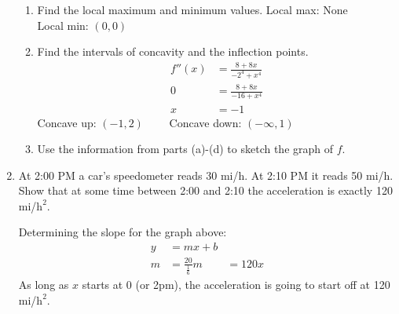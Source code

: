 \documentclass{article}
\begin{document}
\begin{enumerate}
\begin{enumerate}
			\item Find the local maximum and minimum values.\newline
				Local max: None $\qquad$ Local min: $(0,0)$
			\item Find the intervals of concavity and the inflection points.\\
				$$\begin{align}
					f''(x)&=\frac{8+8x}{-2^4+x^4}\\
					0&=\frac{8+8x}{-16+x^4}\\
					x&=-1
				\end{align}$$
				Concave up: $(-1,2)\qquad$ Concave down: $(-\infty,1)$ 
			\item Use the information from parts (a)-(d) to sketch the graph of $f$.
	\begin{center}
		\pgfplotsset{width=16cm,height=7cm, axis equal}
	\end{center}
		\end{enumerate}
\setcounter{enumi}{65}
	\item At 2:00 PM a car's speedometer reads 30 mi/h. At 2:10 PM it reads 50 mi/h. Show that at some time between 2:00 and 2:10 the acceleration is exactly 120 mi/$\text{h}^2$.
	\begin{center}
	\end{center}
	Determining the slope for the graph above:
	$$\begin{align}
		y&=mx+b\\
		m&=\frac{20}{\frac{1}{6}}
		m&=120x
	\end{align}$$
	As long as $x$ starts at 0 (or 2pm), the acceleration is going to start off at 120 mi/$\text{h}^2$.

\end{enumerate}
\end{document}
